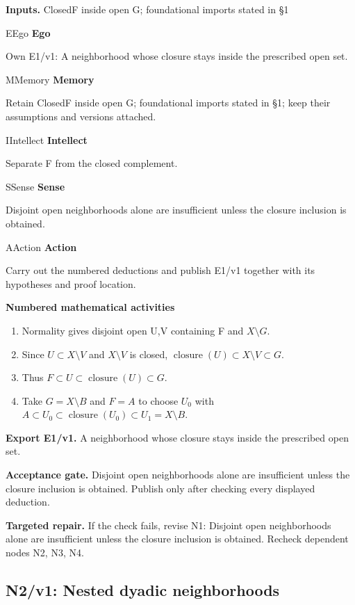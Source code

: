 \documentclass[preprint,12pt,aps,pra,showkeys,amsmath,amssymb,superscriptaddress,floatfix]{revtex4-2}
\theoremstyle{definition}
\theoremstyle{remark}
\newcommand{\mmfaculty}[3]{%
 \begin{mmfacultybox}{#1}{#2}
 {\sffamily\bfseries\color{MMBlue}#2}\par\smallskip #3
 \end{mmfacultybox}}
\newcommand{\field}[2]{\par\smallskip\noindent\textbf{#1.} #2\par}
\begin{document}
\field{Inputs}{ClosedF inside open G; foundational imports stated in §1}

\mmfaculty{E}{Ego}{Own E1/v1: A neighborhood whose closure stays inside the prescribed open
set.}

\mmfaculty{M}{Memory}{Retain ClosedF inside open G; foundational imports stated in §1; keep
their assumptions and versions attached.}

\mmfaculty{I}{Intellect}{Separate F from the closed complement.}

\mmfaculty{S}{Sense}{Disjoint open neighborhoods alone are insufficient unless the closure
inclusion is obtained.}

\mmfaculty{A}{Action}{Carry out the numbered deductions and publish E1/v1 together with its
hypotheses and proof location.}

\smallskip\noindent\textbf{Numbered mathematical activities}

\begin{enumerate}[label=N1.\arabic*,leftmargin=3.4em]

\item Normality gives disjoint open U,V containing F and \(X\setminus G\).

\item Since \(U\subset X\setminus V\) and \(X\setminus V\) is closed,
\(\operatorname{closure} (U)\subset X\setminus V\subset G\).

\item Thus \(F\subset U\subset \operatorname{closure} (U)\subset G\).

\item Take \(G=X\setminus B\) and \(F=A\) to choose \(U_{0}\) with
\(A\subset U_{0}\subset \operatorname{closure} (U_{0})\subset U_{1}=X\setminus B\).

\end{enumerate}

\field{Export E1/v1}{A neighborhood whose closure stays inside the prescribed open set.}

\field{Acceptance gate}{Disjoint open neighborhoods alone are insufficient unless the closure
inclusion is obtained. Publish only after checking every displayed
deduction.}

\field{Targeted repair}{If the check fails, revise N1: Disjoint open neighborhoods alone are
insufficient unless the closure inclusion is obtained. Recheck dependent
nodes N2, N3, N4.}

\clearpage

\subsection{N2/v1: Nested dyadic neighborhoods}
\end{document}
